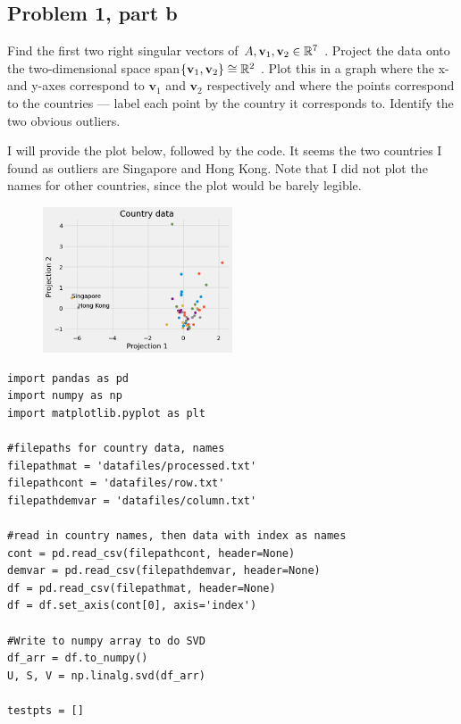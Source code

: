 \subsection{Problem 1, part b}
Find the first two right singular vectors of $A, \textbf{v}_1, \textbf{v}_2 \in \mathbb{R}^7$ . Project the data onto the two-dimensional space span$\{\textbf{v}_1, \textbf{v}_2\} \cong \mathbb{R}^2$ . Plot this in a graph where the x- and y-axes correspond to $\textbf{v}_1$ and $\textbf{v}_2$ respectively and where the points correspond to the countries — label each point by the country it corresponds to. Identify the two obvious outliers.
\partbreak
\begin{solution}

    I will provide the plot below, followed by the code. It seems the two countries I found as outliers are Singapore and Hong Kong. Note that I did not plot the names for other countries, since the plot would be barely legible.

    \begin{figure}[h]
        \centering
        \includegraphics[width = 0.5\textwidth]{Images/problem 1b plot.png}
        \label{fig:problem 1b}
    \end{figure}

\begin{lstlisting}    
import pandas as pd
import numpy as np
import matplotlib.pyplot as plt

#filepaths for country data, names
filepathmat = 'datafiles/processed.txt'
filepathcont = 'datafiles/row.txt'
filepathdemvar = 'datafiles/column.txt'

#read in country names, then data with index as names
cont = pd.read_csv(filepathcont, header=None)
demvar = pd.read_csv(filepathdemvar, header=None)
df = pd.read_csv(filepathmat, header=None)
df = df.set_axis(cont[0], axis='index')

#Write to numpy array to do SVD
df_arr = df.to_numpy()
U, S, V = np.linalg.svd(df_arr)

testpts = []


\end{lstlisting}
\end{solution}
